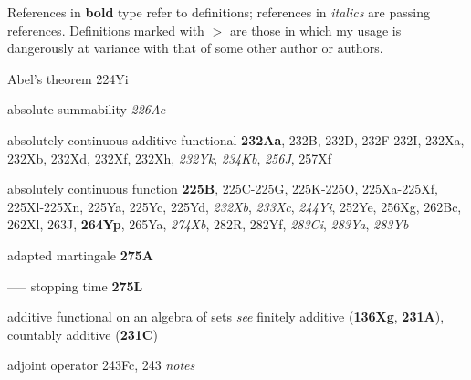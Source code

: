 \indexmedskip


References in {\bf bold} type refer to definitions;
references in {\it italics} are passing references.
Definitions marked with $\pmb{>}$ are those in which my usage is
dangerously at variance with that of some other author or authors.

\indexmedskip



Abel's theorem 224Yi




absolute summability {\it 226Ac}


absolutely continuous additive functional {\bf 232Aa}, 232B, 232D,
232F-232I, 
232Xa, 232Xb, 232Xd, 232Xf, 232Xh, {\it 232Yk},
{\it 234Kb}, {\it 256J}, 257Xf



absolutely continuous function {\bf 225B},
225C-225G, 
225K-225O, 
225Xa-225Xf, 
225Xl-225Xn, 
225Ya, 225Yc, 225Yd, {\it 232Xb}, {\it 233Xc}, {\it 244Yi},
252Ye, 256Xg, 262Bc, 262Xl, 263J, {\bf 264Yp}, 265Ya, {\it 274Xb},
282R, 282Yf,
{\it 283Ci}, {\it 283Ya}, {\it 283Yb}



























adapted martingale {\bf 275A}


----- stopping time {\bf 275L}


additive functional on an algebra of sets {\it see} finitely additive
({\bf 136Xg}, {\bf 231A}), countably additive ({\bf 231C})




















adjoint operator 243Fc, 243 {\it notes}










